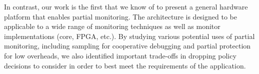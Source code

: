 In contrast, our work is the first that we know of to present a general hardware platform that enables
partial monitoring. The architecture is designed to be applicable to a wide range of monitoring
techniques as well as monitor implementations (core, FPGA, etc.). By studying various potential
uses of partial monitoring, including sampling for cooperative debugging and
partial protection for low overheads, we also identified important trade-offs in dropping
policy decisions to consider in order to best meet the requirements of the
application.


